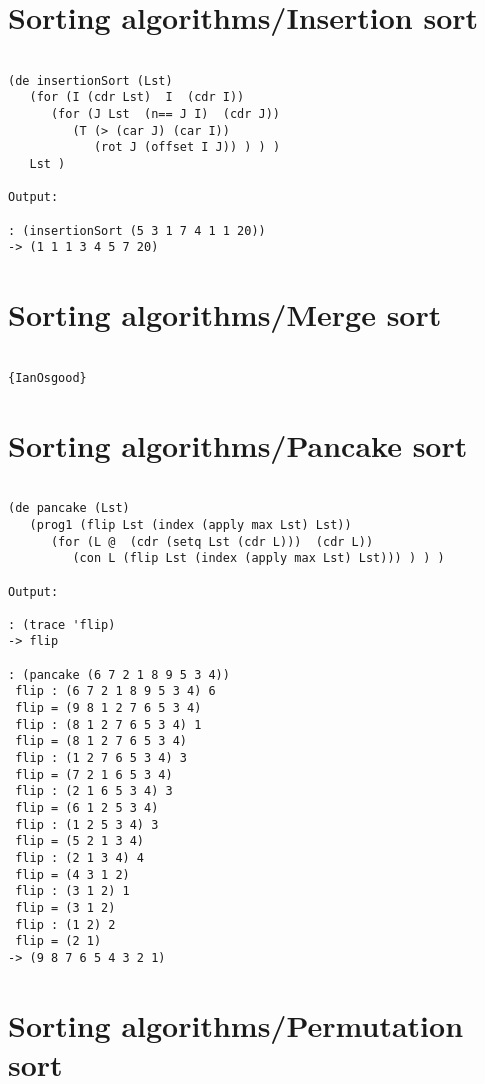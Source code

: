\section*{Sorting algorithms/Insertion sort}

\begin{verbatim}

(de insertionSort (Lst)
   (for (I (cdr Lst)  I  (cdr I))
      (for (J Lst  (n== J I)  (cdr J))
         (T (> (car J) (car I))
            (rot J (offset I J)) ) ) )
   Lst )

Output:

: (insertionSort (5 3 1 7 4 1 1 20))
-> (1 1 1 3 4 5 7 20)

\end{verbatim}

\section*{Sorting algorithms/Merge sort}

\begin{verbatim}

{IanOsgood}

\end{verbatim}

\section*{Sorting algorithms/Pancake sort}

\begin{verbatim}

(de pancake (Lst)
   (prog1 (flip Lst (index (apply max Lst) Lst))
      (for (L @  (cdr (setq Lst (cdr L)))  (cdr L))
         (con L (flip Lst (index (apply max Lst) Lst))) ) ) )

Output:

: (trace 'flip)
-> flip

: (pancake (6 7 2 1 8 9 5 3 4))
 flip : (6 7 2 1 8 9 5 3 4) 6
 flip = (9 8 1 2 7 6 5 3 4)
 flip : (8 1 2 7 6 5 3 4) 1
 flip = (8 1 2 7 6 5 3 4)
 flip : (1 2 7 6 5 3 4) 3
 flip = (7 2 1 6 5 3 4)
 flip : (2 1 6 5 3 4) 3
 flip = (6 1 2 5 3 4)
 flip : (1 2 5 3 4) 3
 flip = (5 2 1 3 4)
 flip : (2 1 3 4) 4
 flip = (4 3 1 2)
 flip : (3 1 2) 1
 flip = (3 1 2)
 flip : (1 2) 2
 flip = (2 1)
-> (9 8 7 6 5 4 3 2 1)

\end{verbatim}

\section*{Sorting algorithms/Permutation sort}

